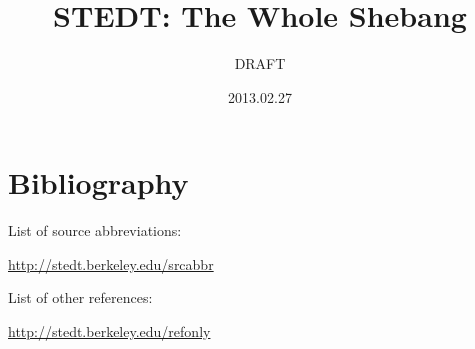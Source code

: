 \documentclass[12pt]{report}
\title{STEDT: The Whole Shebang}
\author{DRAFT}
\date{2013.02.27}
\begin{document}
\setcounter{secnumdepth}{0} %
\maketitle
{}
\tableofcontents
\newpage























\newpage

\section{Bibliography}
List of source abbreviations:

\url{http://stedt.berkeley.edu/srcabbr}

List of other references:

\url{http://stedt.berkeley.edu/refonly}
\end{document}
